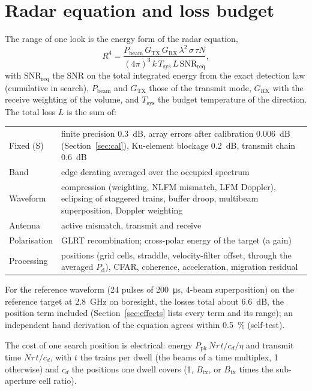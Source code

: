 \documentclass[11pt,a4paper]{article}
\newcommand{\Tsys}{T_{\mathrm{sys}}}
\newcommand{\SNR}{\mathrm{SNR}}
\newcommand{\Pd}{P_{\mathrm d}}
\begin{document}
\section{Radar equation and loss budget}\label{sec:solve}
The range of one look is the energy form of the radar equation,
\[
  R^4 = \frac{P_{\mathrm{beam}}\,G_{\mathrm{TX}}\,G_{\mathrm{RX}}\,\lambda^2\,\sigma\,\tau N}
             {(4\pi)^3\,k\,\Tsys\,L\,\SNR_{\mathrm{req}}},
\]
with $\SNR_{\mathrm{req}}$ the SNR on the total integrated energy from the exact detection law (cumulative in search),
$P_{\mathrm{beam}}$ and $G_{\mathrm{TX}}$ those of the transmit mode, $G_{\mathrm{RX}}$ with the receive weighting of
the volume, and $\Tsys$ the budget temperature of the direction. The total loss $L$ is the sum of:
\begin{center}
\begin{tabularx}{\linewidth}{@{}lL@{}}
\toprule
Fixed (S) & finite precision \SI{0.3}{dB}, array errors after calibration \SI{0.006}{dB} (Section~\ref{sec:cal}),
Ku-element blockage \SI{0.2}{dB}, transmit chain \SI{0.6}{dB}\\
Band & edge derating averaged over the occupied spectrum\\
Waveform & compression (weighting, NLFM mismatch, LFM Doppler), eclipsing of staggered trains, buffer droop, multibeam
superposition, Doppler weighting\\
Antenna & active mismatch, transmit and receive\\
Polarisation & GLRT recombination; cross-polar energy of the target (a gain)\\
Processing & positions (grid cells, straddle, velocity-filter offset, through the averaged $\Pd$), CFAR, coherence,
acceleration, migration residual\\
\bottomrule
\end{tabularx}
\end{center}
For the reference waveform (24 pulses of \SI{200}{\micro s}, 4-beam superposition) on the reference target at
\SI{2.8}{GHz} on boresight, the losses total about \SI{6.6}{dB}, the position term included (Section~\ref{sec:effects}
lists every term and its range); an independent hand derivation
of the equation agrees within \SI{0.5}{\percent} (self-test).

The cost of one search position is electrical: energy $P_{\mathrm{pk}}\,N\tau\,t/c_d/\eta$ and transmit time
$N\tau\,t/c_d$, with $t$ the trains per dwell (the beams of a time multiplex, 1 otherwise) and $c_d$ the positions one
dwell covers (1, $B_{\mathrm{tx}}$, or $B_{\mathrm{tx}}$ times the sub-aperture cell ratio).
\end{document}
